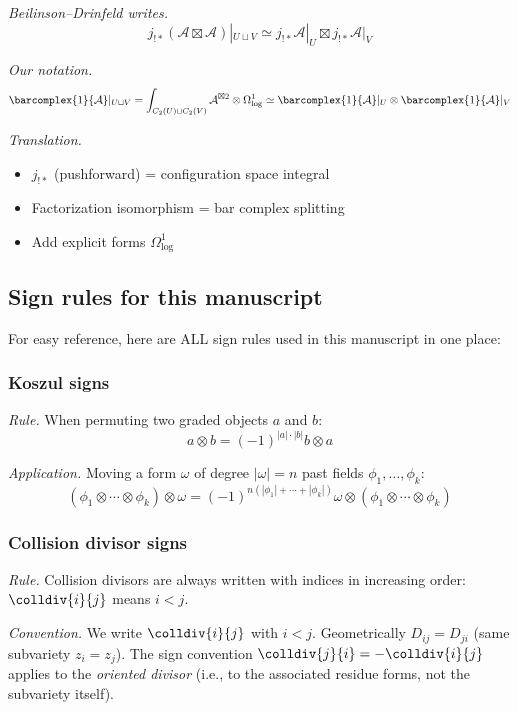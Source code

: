 \begin{example}
\emph{Beilinson--Drinfeld writes.}
\[j_{!*}(\mathcal{A} \boxtimes \mathcal{A})|_{U \sqcup V} \simeq j_{!*}\mathcal{A}|_U \boxtimes j_{!*}\mathcal{A}|_V\]

\emph{Our notation.}
\[\barcomplex{1}{\mathcal{A}}|_{U \sqcup V} = \int_{C_2(U) \sqcup C_2(V)} \mathcal{A}^{\boxtimes 2} \otimes \Omega^1_{\log} \simeq \barcomplex{1}{\mathcal{A}}|_U \otimes \barcomplex{1}{\mathcal{A}}|_V\]

\emph{Translation.}
\begin{itemize}
\item $j_{!*}$ (pushforward) = configuration space integral
\item Factorization isomorphism = bar complex splitting
\item Add explicit forms $\Omega^1_{\log}$
\end{itemize}
\end{example}

\subsection{Sign rules for this manuscript}

For easy reference, here are ALL sign rules used in this manuscript in one place:

\subsubsection{Koszul signs}

\emph{Rule.} When permuting two graded objects $a$ and $b$:
\[a \otimes b = (-1)^{|a| \cdot |b|} b \otimes a\]

\emph{Application.} Moving a form $\omega$ of degree $|\omega| = n$ past fields $\phi_1, \ldots, \phi_k$:
\[(\phi_1 \otimes \cdots \otimes \phi_k) \otimes \omega = (-1)^{n(|\phi_1| + \cdots + |\phi_k|)} \omega \otimes (\phi_1 \otimes \cdots \otimes \phi_k)\]

\subsubsection{Collision divisor signs}

\emph{Rule.} Collision divisors are always written with indices in increasing order: $\colldiv{i}{j}$ means $i < j$.

\emph{Convention.} We write $\colldiv{i}{j}$ with $i < j$. Geometrically $D_{ij} = D_{ji}$ (same subvariety $z_i = z_j$). The sign convention $\colldiv{j}{i} = -\colldiv{i}{j}$ applies to the \emph{oriented divisor} (i.e., to the associated residue forms, not the subvariety itself).

